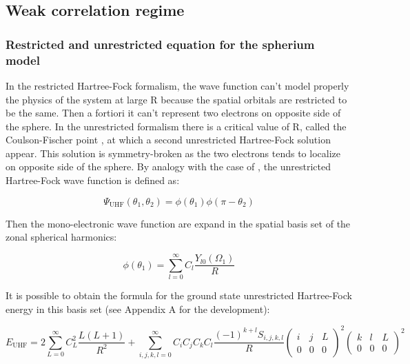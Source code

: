 \documentclass[11pt,a4paper]{article}
\begin{document}
{\subsection{Weak correlation regime}

\subsubsection{Restricted and unrestricted equation for the  spherium model}

In the restricted Hartree-Fock formalism, the wave function can't model properly the physics of the system at large R because the spatial orbitals are restricted to be the same. Then a fortiori it can't represent two electrons on opposite side of the sphere. In the unrestricted formalism there is a critical value of R, called the Coulson-Fischer point \cite{Coulson_1949}, at which a second unrestricted Hartree-Fock solution appear. This solution is symmetry-broken as the two electrons tends to localize on opposite side of the sphere. By analogy with the case of  \cite{SzaboBook}, the unrestricted Hartree-Fock wave function is defined as:

\begin{equation}
\Psi_{\text{UHF}}(\theta_1,\theta_2)=\phi(\theta_1)\phi(\pi-\theta_2)
\end{equation}

Then the mono-electronic wave function are expand in the spatial basis set of the zonal spherical harmonics:

\begin{equation}
\phi(\theta_1)=\sum\limits_{l=0}^{\infty}C_l\frac{Y_{l0}(\Omega_1)}{R}
\end{equation}

It is possible to obtain the formula for the ground state unrestricted Hartree-Fock energy in this basis set (see Appendix A for the development):

\begin{equation}
E_{\text{UHF}} = 2 \sum\limits_{L=0}^{\infty} C_L^2 \frac{L(L+1)}{R^2} + \sum\limits_{i,j,k,l=0}^{\infty}C_iC_jC_kC_l \frac{(-1)^{k+l}S_{i,j,k,l}}{R} \begin{pmatrix}
 i & j & L \\
 0 & 0 & 0
\end{pmatrix}^2 \begin{pmatrix}
 k & l & L \\
 0 & 0 & 0
\end{pmatrix}^2
\label{eq:EUHF}
\end{equation}

}
\end{document}
